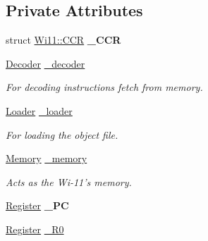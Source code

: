 \subsection*{Private Attributes}
\begin{DoxyCompactItemize}
\item 
\hypertarget{classWi11_a84cb35829890fca6122c023229007002}{
struct \hyperlink{structWi11_1_1CCR}{Wi11::CCR} {\bfseries \_\-CCR}}
\label{classWi11_a84cb35829890fca6122c023229007002}

\item 
\hypertarget{classWi11_a145d0e52ef8bfd21d7b5a0ff3fea43d1}{
\hyperlink{classDecoder}{Decoder} \hyperlink{classWi11_a145d0e52ef8bfd21d7b5a0ff3fea43d1}{\_\-decoder}}
\label{classWi11_a145d0e52ef8bfd21d7b5a0ff3fea43d1}

\begin{DoxyCompactList}\small\item\em For decoding instructions fetch from memory. \item\end{DoxyCompactList}\item 
\hypertarget{classWi11_adedbd5442a90d131f8cfadc8d3eb233f}{
\hyperlink{classLoader}{Loader} \hyperlink{classWi11_adedbd5442a90d131f8cfadc8d3eb233f}{\_\-loader}}
\label{classWi11_adedbd5442a90d131f8cfadc8d3eb233f}

\begin{DoxyCompactList}\small\item\em For loading the object file. \item\end{DoxyCompactList}\item 
\hypertarget{classWi11_a07d3ee0573a4ea7d260574120da9dec1}{
\hyperlink{classMemory}{Memory} \hyperlink{classWi11_a07d3ee0573a4ea7d260574120da9dec1}{\_\-memory}}
\label{classWi11_a07d3ee0573a4ea7d260574120da9dec1}

\begin{DoxyCompactList}\small\item\em Acts as the Wi-\/11's memory. \item\end{DoxyCompactList}\item 
\hypertarget{classWi11_af60b1a832f564e3ac52b4edf7edc8c9a}{
\hyperlink{classRegister}{Register} {\bfseries \_\-PC}}
\label{classWi11_af60b1a832f564e3ac52b4edf7edc8c9a}

\item 
\hypertarget{classWi11_afdde77e5fbf30ef6647572f5c3050b7c}{
\hyperlink{classRegister}{Register} \hyperlink{classWi11_afdde77e5fbf30ef6647572f5c3050b7c}{\_\-R0}}
\label{classWi11_afdde77e5fbf30ef6647572f5c3050b7c}


\end{DoxyCompactItemize}
